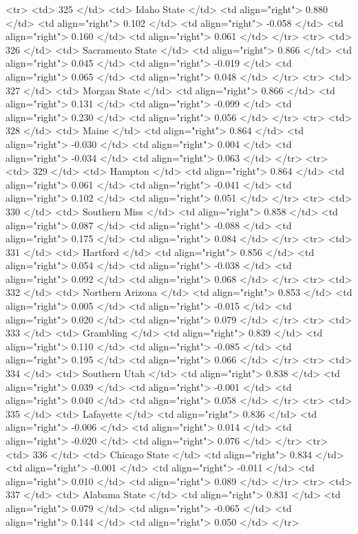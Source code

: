  <tr> <td> 325 </td> <td> Idaho State </td> <td align="right"> 0.880 </td> <td align="right"> 0.102 </td> <td align="right"> -0.058 </td> <td align="right"> 0.160 </td> <td align="right"> 0.061 </td> </tr>
  <tr> <td> 326 </td> <td> Sacramento State </td> <td align="right"> 0.866 </td> <td align="right"> 0.045 </td> <td align="right"> -0.019 </td> <td align="right"> 0.065 </td> <td align="right"> 0.048 </td> </tr>
  <tr> <td> 327 </td> <td> Morgan State </td> <td align="right"> 0.866 </td> <td align="right"> 0.131 </td> <td align="right"> -0.099 </td> <td align="right"> 0.230 </td> <td align="right"> 0.056 </td> </tr>
  <tr> <td> 328 </td> <td> Maine </td> <td align="right"> 0.864 </td> <td align="right"> -0.030 </td> <td align="right"> 0.004 </td> <td align="right"> -0.034 </td> <td align="right"> 0.063 </td> </tr>
  <tr> <td> 329 </td> <td> Hampton </td> <td align="right"> 0.864 </td> <td align="right"> 0.061 </td> <td align="right"> -0.041 </td> <td align="right"> 0.102 </td> <td align="right"> 0.051 </td> </tr>
  <tr> <td> 330 </td> <td> Southern Miss </td> <td align="right"> 0.858 </td> <td align="right"> 0.087 </td> <td align="right"> -0.088 </td> <td align="right"> 0.175 </td> <td align="right"> 0.084 </td> </tr>
  <tr> <td> 331 </td> <td> Hartford </td> <td align="right"> 0.856 </td> <td align="right"> 0.054 </td> <td align="right"> -0.038 </td> <td align="right"> 0.092 </td> <td align="right"> 0.068 </td> </tr>
  <tr> <td> 332 </td> <td> Northern Arizona </td> <td align="right"> 0.853 </td> <td align="right"> 0.005 </td> <td align="right"> -0.015 </td> <td align="right"> 0.020 </td> <td align="right"> 0.079 </td> </tr>
  <tr> <td> 333 </td> <td> Grambling </td> <td align="right"> 0.839 </td> <td align="right"> 0.110 </td> <td align="right"> -0.085 </td> <td align="right"> 0.195 </td> <td align="right"> 0.066 </td> </tr>
  <tr> <td> 334 </td> <td> Southern Utah </td> <td align="right"> 0.838 </td> <td align="right"> 0.039 </td> <td align="right"> -0.001 </td> <td align="right"> 0.040 </td> <td align="right"> 0.058 </td> </tr>
  <tr> <td> 335 </td> <td> Lafayette </td> <td align="right"> 0.836 </td> <td align="right"> -0.006 </td> <td align="right"> 0.014 </td> <td align="right"> -0.020 </td> <td align="right"> 0.076 </td> </tr>
  <tr> <td> 336 </td> <td> Chicago State </td> <td align="right"> 0.834 </td> <td align="right"> -0.001 </td> <td align="right"> -0.011 </td> <td align="right"> 0.010 </td> <td align="right"> 0.089 </td> </tr>
  <tr> <td> 337 </td> <td> Alabama State </td> <td align="right"> 0.831 </td> <td align="right"> 0.079 </td> <td align="right"> -0.065 </td> <td align="right"> 0.144 </td> <td align="right"> 0.050 </td> </tr>
